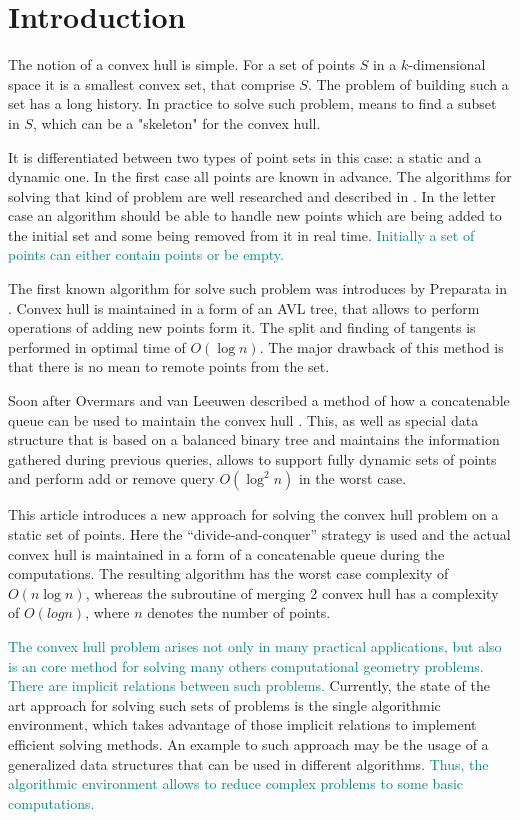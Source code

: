 \documentclass[conference]{IEEEtran}
\theoremstyle{plane}
\begin{document}
\section{Introduction}

The notion of a convex hull is simple. For a set of points $S$ in a $k$-dimensional space it is a smallest convex set, that comprise $S$. The problem of building such a set has a long history. In practice to solve such problem, means to find a subset in $S$, which can be a "skeleton" for the convex hull.

It is differentiated between two types of point sets in this case: a static and a dynamic one. In the first case all points are known in advance. The algorithms for solving that kind of problem are well researched and described in \cite{jarvis, graham, quickhull}. In the letter case an algorithm should be able to handle new points which are being added to the initial set and some  being removed from it in real time. \textcolor{teal}{Initially a set of points can either contain points or be empty.} 

The first known algorithm for solve such problem was introduces by Preparata in \cite{preparata}. Convex hull is maintained in a form of an AVL tree, that allows to perform operations of adding new points form it. The split and finding of tangents is performed in optimal time of $O(\log n)$. The major drawback of this method is that there is no mean to remote points from the set. 

Soon after Overmars and van Leeuwen described a method of how a concatenable queue can be used to maintain the convex hull \cite{overmars}. This, as well as special data structure that is based on a balanced binary tree and maintains the information gathered during previous queries, allows to support fully dynamic sets of points and perform add or remove query  $O(\log^2 n)$ in the worst case.

This article introduces a new approach for solving the convex hull problem on a static set of points. Here the ``divide-and-conquer'' strategy is used and the actual convex hull is maintained in a form of a concatenable queue during the computations. The resulting algorithm has the worst case complexity of $O(n\log n)$, whereas the subroutine of merging 2 convex hull has a complexity of $O(log n)$, where $n$ denotes the number of points.

\textcolor{teal}{The convex hull problem arises not only in many practical applications, but also is an core method for solving many others computational geometry problems. There are implicit relations between such problems.} Currently, the state of the art approach for solving such sets of problems is the single algorithmic environment, which takes advantage of those implicit relations to implement efficient solving methods. An example to such approach may be the usage of a generalized data structures that can be used in different algorithms. \textcolor{teal}{Thus, the algorithmic environment allows to reduce complex problems to some basic computations.}
\end{document}
